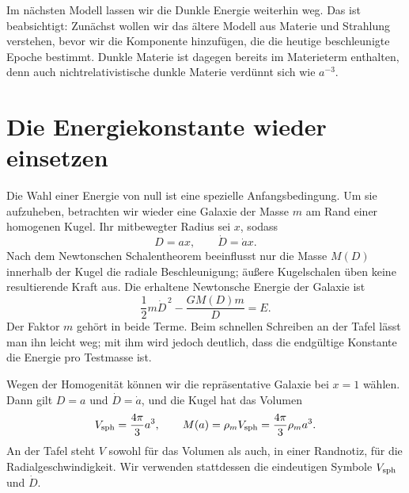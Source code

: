Im nächsten Modell lassen wir die Dunkle Energie weiterhin weg. Das ist beabsichtigt: Zunächst wollen wir das ältere Modell aus Materie und Strahlung verstehen, bevor wir die Komponente hinzufügen, die die heutige beschleunigte Epoche bestimmt. Dunkle Materie ist dagegen bereits im Materieterm enthalten, denn auch nichtrelativistische dunkle Materie verdünnt sich wie \(a^{-3}\).

\begin{classroomqa}
\end{classroomqa}

\section{Die Energiekonstante wieder einsetzen}

Die Wahl einer Energie von null ist eine spezielle Anfangsbedingung. Um sie aufzuheben, betrachten wir wieder eine Galaxie der Masse \(m\) am Rand einer homogenen Kugel. Ihr mitbewegter Radius sei \(x\), sodass
\begin{equation}
D=ax,
\qquad
\dot D=\dot a x.
\label{eq:c02-comoving-particle}
\end{equation}
Nach dem Newtonschen Schalentheorem beeinflusst nur die Masse \(M(D)\) innerhalb der Kugel die radiale Beschleunigung; äußere Kugelschalen üben keine resultierende Kraft aus. Die erhaltene Newtonsche Energie der Galaxie ist
\begin{equation}
\frac{1}{2}m\dot D^{\,2}-\frac{GM(D)m}{D}=E.
\label{eq:c02-newton-energy}
\end{equation}
Der Faktor \(m\) gehört in beide Terme. Beim schnellen Schreiben an der Tafel lässt man ihn leicht weg; mit ihm wird jedoch deutlich, dass die endgültige Konstante die Energie pro Testmasse ist.

Wegen der Homogenität können wir die repräsentative Galaxie bei \(x=1\) wählen. Dann gilt \(D=a\) und \(\dot D=\dot a\), und die Kugel hat das Volumen
\begin{equation}
V_{\rm sph}=\frac{4\pi}{3}a^3,
\qquad
M(a)=\rho_m V_{\rm sph}=\frac{4\pi}{3}\rho_m a^3.
\label{eq:c02-enclosed-mass}
\end{equation}
An der Tafel steht \(V\) sowohl für das Volumen als auch, in einer Randnotiz, für die Radialgeschwindigkeit. Wir verwenden stattdessen die eindeutigen Symbole \(V_{\rm sph}\) und \(\dot D\).

